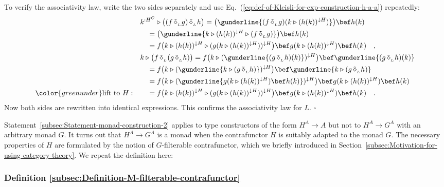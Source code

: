 To verify the associativity law, write the two sides separately and
use Eq.~(\ref{eq:def-of-Kleisli-for-exp-construction-h-a-a}) repeatedly:
\begin{align*}
 & k^{:H^{C}}\triangleright\big((f\,\tilde{\diamond}_{_{L}}g)\,\tilde{\diamond}_{_{L}}h\big)=\big(\gunderline{(f\,\tilde{\diamond}_{_{L}}g)(k\triangleright(h(k))^{\downarrow H})}\big)\bef h(k)\\
 & \quad=\big(\gunderline{k\triangleright(h(k))^{\downarrow H}\triangleright(f\,\tilde{\diamond}_{_{L}}g)}\big)\bef h(k)\\
 & \quad=f\big(k\triangleright(h(k))^{\downarrow H}\triangleright(g(k\triangleright(h(k))^{\downarrow H}))^{\downarrow H}\big)\bef g(k\triangleright(h(k))^{\downarrow H})\bef h(k)\quad,\\
 & k\triangleright\big(f\,\tilde{\diamond}_{_{L}}(g\,\tilde{\diamond}_{_{L}}h)\big)=f\big(k\triangleright(\gunderline{(g\,\tilde{\diamond}_{_{L}}h)(k)})^{\downarrow H}\big)\bef\gunderline{(g\,\tilde{\diamond}_{_{L}}h)(k)}\\
 & \quad=f\big(k\triangleright(\gunderline{k\triangleright(g\,\tilde{\diamond}_{_{L}}h)})^{\downarrow H}\big)\bef\gunderline{k\triangleright(g\,\tilde{\diamond}_{_{L}}h)}\\
 & \quad=f\big(k\triangleright(\gunderline{g(k\triangleright(h(k))^{\downarrow H})\bef h(k)})^{\downarrow H}\big)\bef g(k\triangleright(h(k))^{\downarrow H})\bef h(k)\\
{\color{greenunder}\text{lift to }H:}\quad & \quad=f\big(k\triangleright(h(k))^{\downarrow H}\triangleright(g(k\triangleright(h(k))^{\downarrow H}))^{\downarrow H}\big)\bef g(k\triangleright(h(k))^{\downarrow H})\bef h(k)\quad.
\end{align*}
Now both sides are rewritten into identical expressions. This confirms
the associativity law for $L$. $\square$

Statement~\ref{subsec:Statement-monad-construction-2} applies to
type constructors of the form $H^{A}\rightarrow A$ but not to $H^{A}\rightarrow G^{A}$
with an arbitrary monad $G$. It turns out that $H^{A}\rightarrow G^{A}$
is a monad when the contrafunctor $H$ is suitably adapted to the
monad $G$. The necessary properties of $H$ are formulated by the
notion of  $G$-filterable contrafunctor,
which we briefly introduced in Section~\ref{subsec:Motivation-for-using-category-theory}.
We repeat the definition here:

\subsubsection{Definition \label{subsec:Definition-M-filterable-contrafunctor}\ref{subsec:Definition-M-filterable-contrafunctor}}

